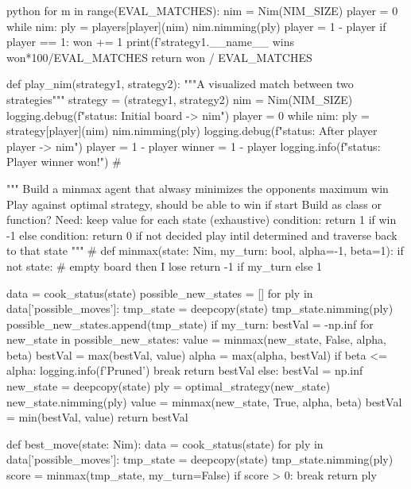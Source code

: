 \begin{mintedbox}{python}
    for m in range(EVAL_MATCHES):
        nim = Nim(NIM_SIZE)
        player = 0
        while nim:
            ply = players[player](nim)
            nim.nimming(ply)
            player = 1 - player
        if player == 1:
            won += 1
    print(f'{strategy1.__name__} wins {won*100/EVAL_MATCHES} %
    return won / EVAL_MATCHES


def play_nim(strategy1, strategy2):
    """A visualized match between two strategies"""
    strategy = (strategy1, strategy2)
    nim = Nim(NIM_SIZE)
    logging.debug(f"status: Initial board  -> {nim}")
    player = 0
    while nim:
        ply = strategy[player](nim)
        nim.nimming(ply)
        logging.debug(f"status: After player {player} -> {nim}")
        player = 1 - player
    winner = 1 - player
    logging.info(f"status: Player {winner} won!")
# %

"""
    Build a minmax agent that alwasy minimizes the opponents maximum win
    Play against optimal strategy, should be able to win if start
    Build as class or function?
    Need:
        keep value for each state (exhaustive)
        condition: return 1 if win -1 else
        condition: return 0 if not decided
            play intil determined and traverse back to that state
"""
# %
def minmax(state: Nim, my_turn: bool, alpha=-1, beta=1):
    if not state:  # empty board then I lose
        return -1 if my_turn else 1

    data = cook_status(state)
    possible_new_states = []
    for ply in data['possible_moves']:
        tmp_state = deepcopy(state)
        tmp_state.nimming(ply)
        possible_new_states.append(tmp_state)
    if my_turn:
        bestVal = -np.inf
        for new_state in possible_new_states:
            value = minmax(new_state, False, alpha, beta)
            bestVal = max(bestVal, value)
            alpha = max(alpha, bestVal)
            if beta <= alpha:
                logging.info(f'Pruned')
                break
        return bestVal
    else:
        bestVal = np.inf
        new_state = deepcopy(state)
        ply = optimal_strategy(new_state)
        new_state.nimming(ply)
        value = minmax(new_state, True, alpha, beta)
        bestVal = min(bestVal, value)
        return bestVal

def best_move(state: Nim):
    data = cook_status(state)
    for ply in data['possible_moves']:
        tmp_state = deepcopy(state)
        tmp_state.nimming(ply)
        score = minmax(tmp_state, my_turn=False)
        if score > 0:
            break
    return ply


\end{mintedbox}
